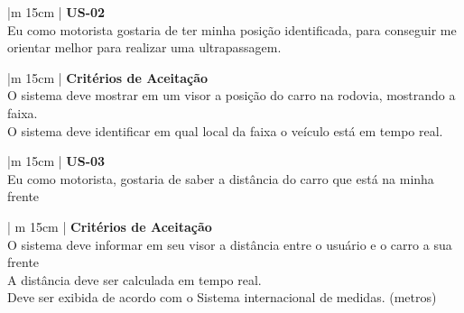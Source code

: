 \begin{table}[ht]
\caption{User Store - 02}
\centering
\begin{tabular}{|m {15cm} |}
\hline
\textbf{US-02} \\
\hline
Eu como motorista gostaria de ter minha posição identificada, para conseguir me
orientar melhor para realizar uma ultrapassagem. \\
\hline
\end{tabular}
\label{table:us01}
\end{table}


\begin{table}[ht]
\caption{Critérios de Aceitaração para User Store - 02}
\centering
\begin{tabular}{|m {15cm} |}
\hline
\textbf{Critérios de Aceitação} \\
\hline
O sistema deve mostrar em um visor a posição do carro na rodovia, mostrando a faixa.\\
\hline
O sistema deve identificar em qual local da faixa o veículo está em tempo real.\\
\hline
\end{tabular}
\label{table:cus01}
\end{table}

\begin{table}[ht]
\caption{User Store - 03}
\centering
\begin{tabular}{|m {15cm} |}
\hline
\textbf{US-03} \\
\hline
Eu como motorista, gostaria de saber a distância do carro que está na minha frente
 \\
\hline
\end{tabular}
\label{table:us03}
\end{table}

\begin{table}[ht]
\caption{Critérios de Aceitaração para User Store - 03}
\centering
\begin{tabular}{| m {15cm} |}
\hline
\textbf{Critérios de Aceitação} \\
\hline
O sistema deve informar em seu visor a distância entre o usuário e o carro a sua frente\\
\hline
A distância deve ser calculada em tempo real. \\
\hline
Deve ser exibida de acordo com o Sistema internacional de medidas. (metros) \\
\hline
\end{tabular}
\label{table:cus01}
\end{table}


